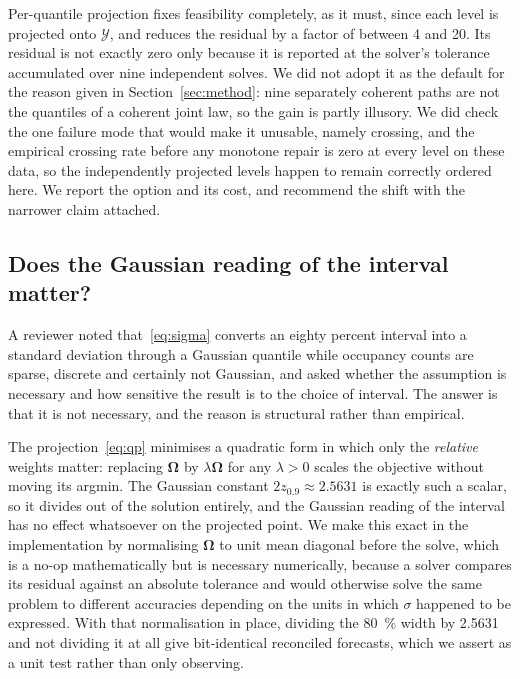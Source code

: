 \documentclass[11pt]{article}
\theoremstyle{plain}
\theoremstyle{definition}
\theoremstyle{remark}
\newcommand{\bOm}{\bm{\Omega}}
\newcommand{\cY}{\mathcal{Y}}
\newif\ifrevisionmarkup
\newcommand{\new}[1]{\ifrevisionmarkup\textcolor{revision}{#1}\else#1\fi}
\begin{document}
\new{Per-quantile projection fixes feasibility completely, as it must, since each level is projected onto $\cY$, and reduces the residual by a factor of between \num{4} and \num{20}. Its residual is not exactly zero only because it is reported at the solver's tolerance accumulated over nine independent solves. We did not adopt it as the default for the reason given in Section~\ref{sec:method}: nine separately coherent paths are not the quantiles of a coherent joint law, so the gain is partly illusory. We did check the one failure mode that would make it unusable, namely crossing, and the empirical crossing rate before any monotone repair is zero at every level on these data, so the independently projected levels happen to remain correctly ordered here. We report the option and its cost, and recommend the shift with the narrower claim attached.}

\subsection{\new{Does the Gaussian reading of the interval matter?}}
\label{sec:sigma}

\new{A reviewer noted that~\eqref{eq:sigma} converts an eighty percent interval into a standard deviation through a Gaussian quantile while occupancy counts are sparse, discrete and certainly not Gaussian, and asked whether the assumption is necessary and how sensitive the result is to the choice of interval. The answer is that it is not necessary, and the reason is structural rather than empirical.}

\new{The projection~\eqref{eq:qp} minimises a quadratic form in which only the \emph{relative} weights matter: replacing $\bOm$ by $\lambda\bOm$ for any $\lambda>0$ scales the objective without moving its argmin. The Gaussian constant $2z_{0.9} \approx 2.5631$ is exactly such a scalar, so it divides out of the solution entirely, and the Gaussian reading of the interval has no effect whatsoever on the projected point. We make this exact in the implementation by normalising $\bOm$ to unit mean diagonal before the solve, which is a no-op mathematically but is necessary numerically, because a solver compares its residual against an absolute tolerance and would otherwise solve the same problem to different accuracies depending on the units in which $\sigma$ happened to be expressed. With that normalisation in place, dividing the \SI{80}{\percent} width by \num{2.5631} and not dividing it at all give bit-identical reconciled forecasts, which we assert as a unit test rather than only observing.}
\end{document}
